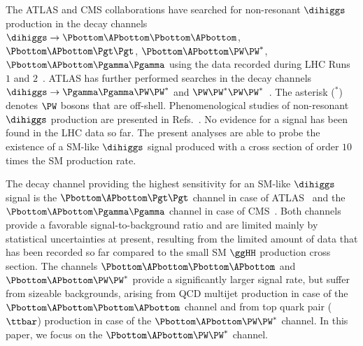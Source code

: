
The ATLAS and CMS collaborations have searched for non-resonant $\dihiggs$ production in the decay channels 
$\dihiggs \to \Pbottom\APbottom\Pbottom\APbottom$, $\Pbottom\APbottom\Pgt\Pgt$, $\Pbottom\APbottom\PW\PW^{\ast}$, $\Pbottom\APbottom\Pgamma\Pgamma$
using the data recorded during LHC Runs $1$ and $2$~\cite{HIG-13-032,HIG-15-013,HIG-17-030,Sirunyan:2020xok,Aad:2015xja,Aaboud:2018knk,Aaboud:2018ftw,Aaboud:2018sfw,Aaboud:2018zhh}.
ATLAS has further performed searches in the decay channels $\dihiggs \to \Pgamma\Pgamma\PW\PW^{\ast}$ and $\PW\PW^{\ast}\PW\PW^{\ast}$~\cite{Aad:2015xja,Aaboud:2018ewm,Aaboud:2018ksn}.
The asterisk ($^{\ast}$) denotes $\PW$ bosons that are off-shell.
Phenomenological studies of non-resonant $\dihiggs$ production are presented in 
Refs.~\cite{Baur:2002rb,Baur:2002qd,Baur:2003gpa,Baur:2003gp,Dolan:2012rv,Papaefstathiou:2012qe,Baglio:2012np,deLima:2014dta,Wardrope:2014kya,Behr:2015oqq,Li:2015yia,Adhikary:2017jtu}.
No evidence for a signal has been found in the LHC data so far.
The present analyses are able to probe the existence of a SM-like $\dihiggs$ signal produced with a cross section of order $10$ times the SM production rate.

The decay channel providing the highest sensitivity for an SM-like $\dihiggs$ signal 
is the $\Pbottom\APbottom\Pgt\Pgt$ channel in case of ATLAS~\cite{Aaboud:2018sfw} and the $\Pbottom\APbottom\Pgamma\Pgamma$ channel in case of CMS~\cite{Sirunyan:2020xok}.
Both channels provide a favorable signal-to-background ratio and are limited mainly by statistical uncertainties at present,
resulting from the limited amount of data that has been recorded so far compared to the small SM $\ggHH$ production cross section.
The channels $\Pbottom\APbottom\Pbottom\APbottom$ and $\Pbottom\APbottom\PW\PW^{\ast}$ provide a significantly larger signal rate,
but suffer from sizeable backgrounds,
arising from QCD multijet production in case of the $\Pbottom\APbottom\Pbottom\APbottom$ channel 
and from top quark pair ($\ttbar$) production in case of the $\Pbottom\APbottom\PW\PW^{\ast}$ channel.
In this paper, we focus on the $\Pbottom\APbottom\PW\PW^{\ast}$ channel.
 
